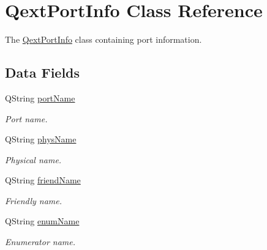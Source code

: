 \hypertarget{struct_qext_port_info}{}\section{Qext\+Port\+Info Class Reference}
\label{struct_qext_port_info}


The \mbox{\hyperlink{struct_qext_port_info}{Qext\+Port\+Info}} class containing port information.  


\subsection*{Data Fields}
\begin{DoxyCompactItemize}
\item 
\mbox{\label{struct_qext_port_info_a541042ffa6d24b057b755ab19d128742}} 
Q\+String \mbox{\hyperlink{struct_qext_port_info_a541042ffa6d24b057b755ab19d128742}{port\+Name}}
\begin{DoxyCompactList}\small\item\em Port name. \end{DoxyCompactList}\item 
\mbox{\label{struct_qext_port_info_add8ba85aa011fec3128703b7473b30dd}} 
Q\+String \mbox{\hyperlink{struct_qext_port_info_add8ba85aa011fec3128703b7473b30dd}{phys\+Name}}
\begin{DoxyCompactList}\small\item\em Physical name. \end{DoxyCompactList}\item 
\mbox{\label{struct_qext_port_info_a6f457917a6c7eea103b3693c3d6287e7}} 
Q\+String \mbox{\hyperlink{struct_qext_port_info_a6f457917a6c7eea103b3693c3d6287e7}{friend\+Name}}
\begin{DoxyCompactList}\small\item\em Friendly name. \end{DoxyCompactList}\item 
\mbox{\label{struct_qext_port_info_a22d3ce6e67fa80da17e91732561c08ff}} 
Q\+String \mbox{\hyperlink{struct_qext_port_info_a22d3ce6e67fa80da17e91732561c08ff}{enum\+Name}}
\begin{DoxyCompactList}\small\item\em Enumerator name. \end{DoxyCompactList}\item 

\end{DoxyCompactItemize}
